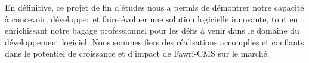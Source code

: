En définitive, ce projet de fin d'études nous a permis de démontrer notre capacité à concevoir, développer et faire évoluer une solution logicielle innovante, tout en enrichissant notre bagage professionnel pour les défis à venir dans le domaine du développement logiciel. Nous sommes fiers des réalisations accomplies et confiants dans le potentiel de croissance et d'impact de Fawri-CMS sur le marché.


